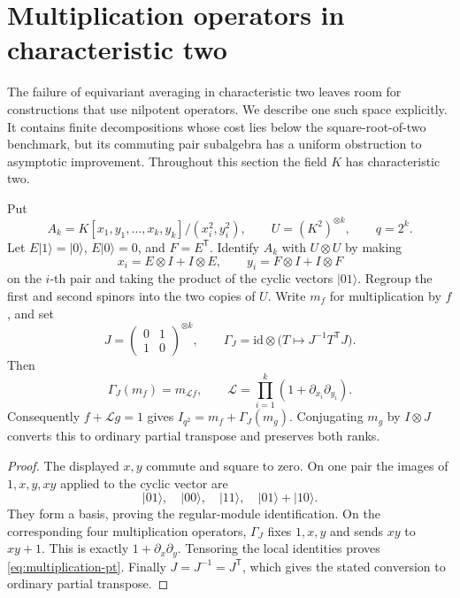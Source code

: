 \section{Multiplication operators in characteristic two}
\label{sec:modular-multiplication}

The failure of equivariant averaging in characteristic two leaves room
for constructions that use nilpotent operators. We describe one such
space explicitly. It contains finite decompositions whose cost lies
below the square-root-of-two benchmark, but its commuting pair
subalgebra has a uniform obstruction to asymptotic improvement.
Throughout this section the field \(K\) has characteristic two.

\begin{proposition}
\label{prop:modular-multiplication}
Put
\[
 A_k=K[x_1,y_1,\ldots,x_k,y_k]/(x_i^2,y_i^2),
 \qquad U=(K^2)^{\otimes k},\qquad q=2^k.
\]
Let \(E|1\rangle=|0\rangle\), \(E|0\rangle=0\), and \(F=E^{\mathsf T}\).
Identify \(A_k\) with \(U\otimes U\) by making
\[
 x_i=E\otimes I+I\otimes E,\qquad
 y_i=F\otimes I+I\otimes F
\]
on the \(i\)-th pair and taking the product of the cyclic vectors
\(|01\rangle\). Regroup the first and second spinors into the two
copies of \(U\). Write \(m_f\) for multiplication by \(f\), and set
\[
 J=\begin{pmatrix}0&1\\1&0\end{pmatrix}^{\otimes k},
 \qquad
 \Gamma_J=\mathrm{id}\otimes
       \bigl(T\mapsto J^{-1}T^{\mathsf T}J\bigr).
\]
Then
\begin{equation}\label{eq:multiplication-pt}
 \Gamma_J(m_f)=m_{\mathcal Lf},
 \qquad
 \mathcal L=\prod_{i=1}^k
           (1+\partial_{x_i}\partial_{y_i}).
\end{equation}
Consequently \(f+\mathcal Lg=1\) gives
\(I_{q^2}=m_f+\Gamma_J(m_g)\). Conjugating \(m_g\) by \(I\otimes J\)
converts this to ordinary partial transpose and preserves both ranks.
\end{proposition}
\begin{proof}
The displayed \(x,y\) commute and square to zero. On one pair the
images of \(1,x,y,xy\) applied to the cyclic vector are
\[
 |01\rangle,\quad |00\rangle,\quad |11\rangle,\quad
 |01\rangle+|10\rangle.
\]
They form a basis, proving the regular-module identification.
On the corresponding four multiplication operators, \(\Gamma_J\)
fixes \(1,x,y\) and sends \(xy\) to \(xy+1\). This is exactly
\(1+\partial_x\partial_y\). Tensoring the local identities proves
\eqref{eq:multiplication-pt}. Finally \(J=J^{-1}=J^{\mathsf T}\),
which gives the stated conversion to ordinary partial transpose.
\end{proof}

